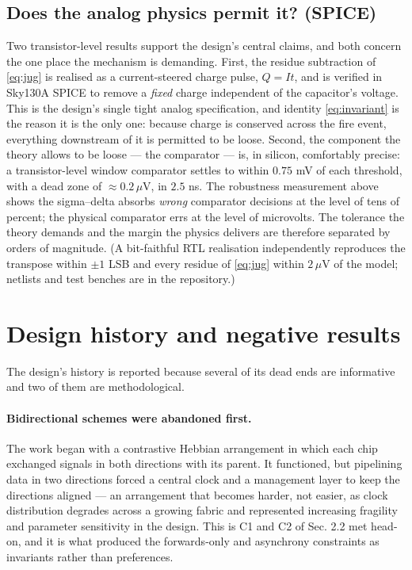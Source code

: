 \documentclass[11pt]{article}
\begin{document}
\hypertarget{does-the-analog-physics-permit-it-spice}{%
\subsection{Does the analog physics permit it?
(SPICE)}\label{does-the-analog-physics-permit-it-spice}}

Two transistor-level results support the design's central claims, and
both concern the one place the mechanism is demanding. First, the
residue subtraction of \eqref{eq:jug} is realised as a current-steered charge
pulse, \(Q = It\), and is verified in Sky130A SPICE to remove a
\emph{fixed} charge independent of the capacitor's voltage. This is the
design's single tight analog specification, and identity \eqref{eq:invariant} is the
reason it is the only one: because charge is conserved across the fire
event, everything downstream of it is permitted to be loose. Second, the
component the theory allows to be loose --- the comparator --- is, in
silicon, comfortably precise: a transistor-level window comparator
settles to within \(0.75\) mV of each threshold, with a dead zone of
\(\approx 0.2\,\mu\)V, in \(2.5\) ns. The robustness measurement above
shows the sigma--delta absorbs \emph{wrong} comparator decisions at the
level of tens of percent; the physical comparator errs at the level of
microvolts. The tolerance the theory demands and the margin the physics
delivers are therefore separated by orders of magnitude. (A bit-faithful
RTL realisation independently reproduces the transpose within \(\pm1\)
LSB and every residue of \eqref{eq:jug} within \(2\,\mu\)V of the model; netlists
and test benches are in the repository.)

\hypertarget{sec:history}{%
\section{Design history and negative results}\label{sec:history}}

The design's history is reported because several of its dead ends are
informative and two of them are methodological.

\hypertarget{bidirectional-schemes-were-abandoned-first.}{%
\paragraph{Bidirectional schemes were abandoned
first.}\label{bidirectional-schemes-were-abandoned-first.}}

The work began with a contrastive Hebbian arrangement in which each chip
exchanged signals in both directions with its parent. It functioned, but
pipelining data in two directions forced a central clock and a
management layer to keep the directions aligned --- an arrangement that
becomes harder, not easier, as clock distribution degrades across a
growing fabric and represented increasing fragility and parameter
sensitivity in the design. This is C1 and C2 of Sec. 2.2 met head-on,
and it is what produced the forwards-only and asynchrony constraints as
invariants rather than preferences.
\end{document}
